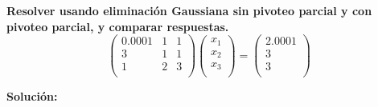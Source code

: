 \textbf{Resolver usando eliminación Gaussiana sin pivoteo parcial y con pivoteo parcial, y comparar respuestas.}\\

    \[
    \left(\begin{array}{ccc}
        0.0001 & 1 & 1  \\
         3 & 1 & 1 \\
         1 & 2 & 3 \\
    \end{array}\right) \left(\begin{array}{c}
         x_1  \\
         x_2 \\
         x_3 \\
    \end{array} \right) = \left(\begin{array}{c}
         2.0001  \\
         3 \\
         3 \\
    \end{array}\right)\]
    
    \textbf{Solución:}\\
    

